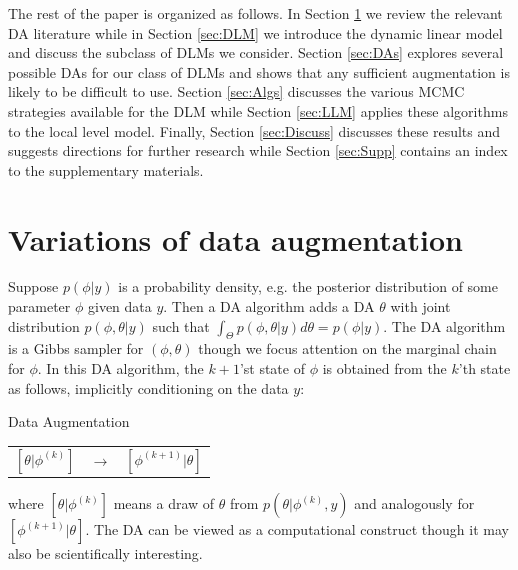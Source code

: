 \documentclass[12pt]{article}
\begin{document}
The rest of the paper is organized as follows. In Section \ref{sec:DA} we review the relevant DA literature while in Section \ref{sec:DLM} we introduce the dynamic linear model and discuss the subclass of DLMs we consider. Section \ref{sec:DAs} explores several possible DAs for our class of DLMs and shows that any sufficient augmentation is likely to be difficult to use. Section \ref{sec:Algs} discusses the various MCMC strategies available for the DLM while Section \ref{sec:LLM} applies these algorithms to the local level model. Finally, Section \ref{sec:Discuss} discusses these results and suggests directions for further research while Section \ref{sec:Supp} contains an index to the supplementary materials.

\section{Variations of data augmentation}\label{sec:DA}

Suppose $p(\phi|y)$ is a probability density, e.g. the posterior distribution of some parameter $\phi$ given data $y$. Then a DA algorithm adds a DA $\theta$ with joint distribution $p(\phi,\theta|y)$ such that $\int_{\Theta}p(\phi,\theta|y)d\theta = p(\phi|y)$. The DA algorithm is a Gibbs sampler for $(\phi,\theta)$ though we focus attention on the marginal chain for $\phi$. In this DA algorithm, the $k+1$'st state of $\phi$ is obtained from the $k$'th state as follows, implicitly conditioning on the data $y$:
\begin{alg*}[DA]Data Augmentation\label{alg:DA}
{\small
\begin{center}
  \begin{tabular}{lll}
  $[\theta|\phi^{(k)}]$ &$\to$& $[\phi^{(k+1)}|\theta]$
\end{tabular}
\end{center}
}
\end{alg*}
\noindent where $[\theta|\phi^{(k)}]$ means a draw of $\theta$ from $p(\theta|\phi^{(k)},y)$ and  analogously for $[\phi^{(k+1)}|\theta]$. The DA can be viewed as a computational construct though it may also be scientifically interesting. 
\end{document}
